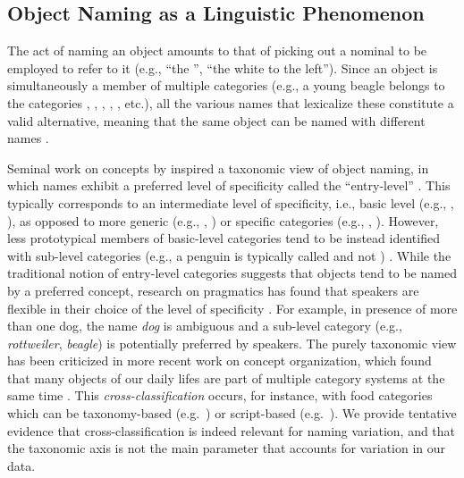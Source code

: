 \subsection{Object Naming as a Linguistic Phenomenon}

The act of naming an object amounts to that of picking out a nominal to be employed to refer to it (e.g., ``the '', ``the white  to the left'').
Since an object is simultaneously a member of multiple categories (e.g., a young beagle belongs to the categories , , , , , etc.), all the various names that lexicalize these constitute a valid alternative, meaning that the same object can be named with different names \cite{brown1958shall,murphy2004big}.

Seminal work on concepts by  inspired a taxonomic view of object naming, in which names exhibit a preferred level of specificity called the ``entry-level'' \cite{jolicoeur1984pictures}. This typically corresponds to an intermediate level of specificity, i.e., basic level (e.g., , ), as opposed to more generic (e.g., , ) or specific categories (e.g., , ). 
However, less prototypical members of basic-level categories tend to be instead identified with sub-level categories (e.g., a penguin is typically called  and not ) \cite{jolicoeur1984pictures}. 
While the traditional notion of entry-level categories suggests that objects tend to be named by a  preferred concept, research on pragmatics has found that speakers are flexible in their choice of the level of specificity \cite{olson1970language,rohde2012communicating,graf2016animal}.
For example, in presence of more than one dog, the name \textsl{dog} is ambiguous and a sub-level category (e.g., \textsl{rottweiler}, \textsl{beagle}) is potentially preferred by speakers.
The purely taxonomic view has been criticized in more recent work on concept organization, which found that many objects of our daily lifes are part of multiple category systems at the same time \cite{ross1999food,SHAFTO20111}. 
This \textit{cross-classification} occurs, for instance, with food categories which can be taxonomy-based (e.g.\ ) or script-based (e.g.\  ).
We provide tentative evidence that cross-classification is indeed relevant for naming variation, and that the taxonomic axis is not the main parameter that accounts for variation in our data.

